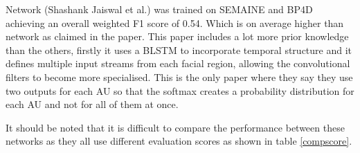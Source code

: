 \documentclass[11pt,twoside]{report}
\begin{document}
Network \cite{Jaiswal2016} (Shashank Jaiswal et al.) was trained on SEMAINE and
BP4D achieving an overall weighted F1 score of 0.54. Which is on average higher
than network \cite{Gudi2015} as claimed in the paper. This paper includes a lot more
prior knowledge than the others, firstly it uses a BLSTM to incorporate temporal structure
and it defines multiple input streams from each facial region, allowing the convolutional
filters to become more specialised. This is the only paper where they say they use
two outputs for each AU so that the softmax creates a probability distribution for
each AU and not for all of them at once.

It should be noted that it is difficult to compare the performance between these
networks as they all use different evaluation scores as shown in table \ref{compscore}.
\end{document}
